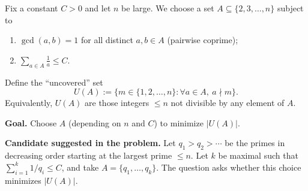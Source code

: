
Fix a constant $C>0$ and let $n$ be large.
We choose a set $A\subseteq\{2,3,\dots,n\}$ subject to
\begin{enumerate}[label=(\roman*),leftmargin=2em]
\item $\gcd(a,b)=1$ for all distinct $a,b\in A$ (pairwise coprime);
\item $\displaystyle \sum_{a\in A} \frac1a \le C$.
\end{enumerate}
Define the ``uncovered'' set
\[
U(A) := \big\{ m\in\{1,2,\dots,n\}: \forall a\in A,\ a\nmid m\big\}.
\]
Equivalently, $U(A)$ are those integers $\le n$ not divisible by any element of $A$.

\medskip
\noindent\textbf{Goal.}
Choose $A$ (depending on $n$ and $C$) to minimize $|U(A)|$.

\medskip
\noindent\textbf{Candidate suggested in the problem.}
Let $q_1>q_2>\cdots$ be the primes in decreasing order starting at the largest prime $\le n$.
Let $k$ be maximal such that $\sum_{i=1}^k 1/q_i \le C$, and take $A=\{q_1,\dots,q_k\}$.
The question asks whether this choice minimizes $|U(A)|$.
